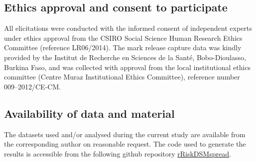 \documentclass[]{bmcart}
\begin{document}
\begin{backmatter}
\subsection*{Ethics approval and consent to participate}
All elicitations were conducted with the informed consent of independent experts under ethics approval from the CSIRO Social Science Human Research Ethics Committee (reference LR06/2014). The mark release capture data was kindly provided by the Institut de Recherche en Sciences de la Sant\'{e}, Bobo-Dioulasso, Burkina Faso, and was collected with approval from the local institutional ethics committee (Centre Muraz Institutional Ethics Committee), reference number 009–2012/CE-CM.

\subsection*{Availability of data and material}

The datasets used and/or analysed during the current study are available from the corresponding author on reasonable request. The code used to generate the results is accessible from the following github repository \href{https://github.com/ick003/rRiskDSMspread}{rRiskDSMspread}.




\end{backmatter}
\end{document}

